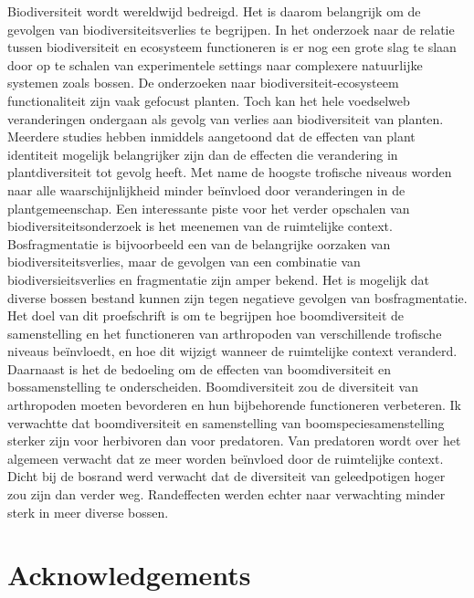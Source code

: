 \documentclass[b5paper,10pt]{book} %
\begin{document}
	Biodiversiteit wordt wereldwijd bedreigd. Het is daarom belangrijk om de gevolgen van biodiversiteitsverlies te begrijpen. In het onderzoek naar de relatie tussen biodiversiteit en ecosysteem functioneren is er nog een grote slag te slaan door op te schalen van experimentele settings naar complexere natuurlijke systemen zoals bossen. De onderzoeken naar biodiversiteit-ecosysteem functionaliteit zijn vaak gefocust planten. Toch kan het hele voedselweb veranderingen ondergaan als gevolg van verlies aan biodiversiteit van planten. Meerdere studies hebben inmiddels aangetoond dat de effecten van plant identiteit mogelijk belangrijker zijn dan de effecten die verandering in plantdiversiteit tot gevolg heeft. Met name de hoogste trofische niveaus worden naar alle waarschijnlijkheid minder beïnvloed door veranderingen in de plantgemeenschap. Een interessante piste voor het verder opschalen van biodiversiteitsonderzoek is het meenemen van de ruimtelijke context. Bosfragmentatie is bijvoorbeeld een van de belangrijke oorzaken van biodiversiteitsverlies, maar de gevolgen van een combinatie van biodiversieitsverlies en fragmentatie zijn amper bekend. Het is mogelijk dat diverse bossen bestand kunnen zijn tegen negatieve gevolgen van bosfragmentatie. Het doel van dit proefschrift is om te begrijpen hoe boomdiversiteit de samenstelling en het functioneren van arthropoden van verschillende trofische niveaus beïnvloedt, en hoe dit wijzigt wanneer de ruimtelijke context veranderd. Daarnaast is het de bedoeling om de effecten van boomdiversiteit en bossamenstelling te onderscheiden. Boomdiversiteit zou de diversiteit van arthropoden moeten bevorderen en hun bijbehorende functioneren verbeteren. Ik verwachtte dat boomdiversiteit en samenstelling van boomspeciesamenstelling sterker zijn voor herbivoren dan voor predatoren. Van predatoren wordt over het algemeen verwacht dat ze meer worden beïnvloed door de ruimtelijke context. Dicht bij de bosrand werd verwacht dat de diversiteit van geleedpotigen hoger zou zijn dan verder weg. Randeffecten werden echter naar verwachting minder sterk in meer diverse bossen.

	

                                
	


\newpage
\thispagestyle{plain} %
\mbox{}
	\clearpage{\thispagestyle{empty}\cleardoublepage}
	\ClearWallPaper	
	\chapter{Acknowledgements}
	
\end{document}

